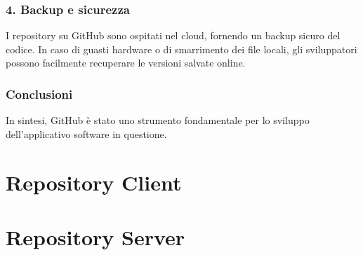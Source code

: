 \subsubsection*{4. Backup e sicurezza}
I repository su GitHub sono ospitati nel cloud, fornendo un backup sicuro del codice. In caso di guasti hardware o di smarrimento dei file locali, gli sviluppatori possono facilmente recuperare le versioni salvate online.

\subsubsection{Conclusioni}
In sintesi, GitHub è stato uno strumento fondamentale per lo sviluppo dell'applicativo software in questione. 


\section{Repository Client}

\section{Repository Server}

